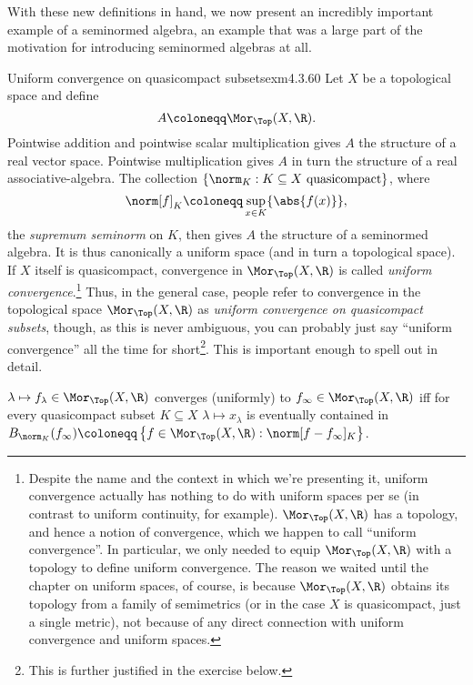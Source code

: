 With these new definitions in hand, we now present an incredibly important example of a seminormed algebra, an example that was a large part of the motivation for introducing seminormed algebras at all.
\begin{exm}{Uniform convergence on quasicompact subsets}{exm4.3.60}
Let $X$ be a topological space and define
\begin{equation}
A\coloneqq \Mor _{\Top}(X,\R ).
\end{equation}
Pointwise addition and pointwise scalar multiplication gives $A$ the structure of a real vector space.  Pointwise multiplication gives $A$ in turn the structure of a real associative-algebra.  The collection $\{ \norm _K:K\subseteq X\text{ quasicompact}\}$, where
\begin{equation}
\norm[f]_K\coloneqq \sup _{x\in K}\{ \abs{f(x)}\} ,
\end{equation}
the \emph{supremum seminorm} on $K$, then gives $A$ the structure of a seminormed algebra.  It is thus canonically a uniform space (and in turn a topological space).  If $X$ itself is quasicompact, convergence in $\Mor _{\Top}(X,\R )$ is called \emph{uniform convergence}.\footnote{Despite the name and the context in which we're presenting it, uniform convergence actually has nothing to do with uniform spaces per se (in contrast to uniform continuity, for example).  $\Mor _{\Top}(X,\R )$ has a topology, and hence a notion of convergence, which we happen to call ``uniform convergence''.  In particular, we only needed to equip $\Mor _{\Top}(X,\R )$ with a topology to define uniform convergence.  The reason we waited until the chapter on uniform spaces, of course, is because $\Mor _{\Top}(X,\R )$ obtains its topology from a family of semimetrics (or in the case $X$ is quasicompact, just a single metric), not because of any direct connection with uniform convergence and uniform spaces.}  Thus, in the general case, people refer to convergence in the topological space $\Mor _{\Top}(X,\R )$ as \emph{uniform convergence on quasicompact subsets}, though, as this is never ambiguous, you can probably just say ``uniform convergence'' all the time for short\footnote{This is further justified in the exercise below.}.  This is important enough to spell out in detail.
\begin{displayquote}
$\lambda \mapsto f_{\lambda}\in \Mor _{\Top}(X,\R )$ converges (uniformly) to $f_{\infty}\in \Mor _{\Top}(X,\R )$ iff for every quasicompact subset $K\subseteq X$ $\lambda \mapsto x_{\lambda}$ is eventually contained in $B_{\norm _K}(f_{\infty})\coloneqq \left\{ f\in \Mor _{\Top}(X,\R ):\norm[f-f_{\infty}]_K\right\} $.  

\end{displayquote}
\end{exm}

